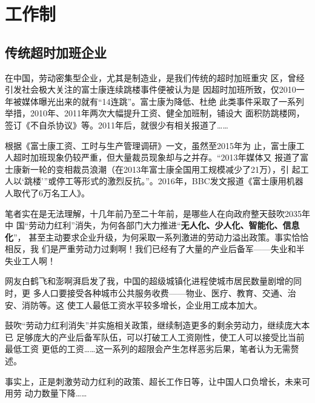 \chapter{工作制}

\section{传统超时加班企业}

在中国，劳动密集型企业，尤其是制造业，是我们传统的超时加班重灾
区\cite{guojilaogongshijian}，曾经引发社会极大关注的富士康连续跳楼事件便被认为是
因超时加班所致，仅2010一年被媒体曝光出来的就有“14连跳”。富士康为降低、杜绝
此类事件采取了一系列举措，2010年、2011年两次大幅提升工资、健全加班制，铺设大
面积防跳楼网，签订《不自杀协议》等。2011年后，就很少有相关报道了……

根据《富士康工资、工时与生产管理调研》\cite{fushikangzuixin}一文，虽然至2015年为
止，富士康工人超时加班现象仍较严重，但大量裁员现象却与之并存。“2013年媒体又
报道了富士康新一轮的变相裁员浪潮（在2013年富士康全国用工规模减少了21万），引
起工人以`跳楼'”或停工等形式的激烈反抗。”。2016年，BBC发文报道《富士康用机器
人取代了6万名工人》。

笔者实在是无法理解，十几年前乃至二十年前，是哪些人在向政府整天鼓吹2035年中
国“劳动力红利”消失，为何各部门大力推进“\textbf{无人化、少人化、智能化、信息化}”，
甚至主动要求企业升级，为何采取一系列激进的劳动力溢出政策。事实恰恰相反，我
们是严重劳动力过剩啊！我们已经有了大量的产业后备军——失业和半失业工人啊！


网友白鹤飞和澎啊湃启发了我，中国的超级城镇化进程使城市居民数量剧增的同时，更
多人口要接受各种城市公共服务收费——物业、医疗、教育、交通、治安、消防等。这
使工人最低工资水平较多增长，企业用工成本加大。

鼓吹“劳动力红利消失”并实施相关政策，继续制造更多的剩余劳动力，继续庞大本已
足够庞大的产业后备军队伍，可以打破工人工资刚性，使工人可以接受比当前最低工资
更低的工资……这一系列的超限会产生怎样恶劣后果，笔者认为无需赘述。

事实上，正是刺激劳动力红利的政策、超长工作日等，让中国人口负增长，未来可用劳
动力数量下降……



